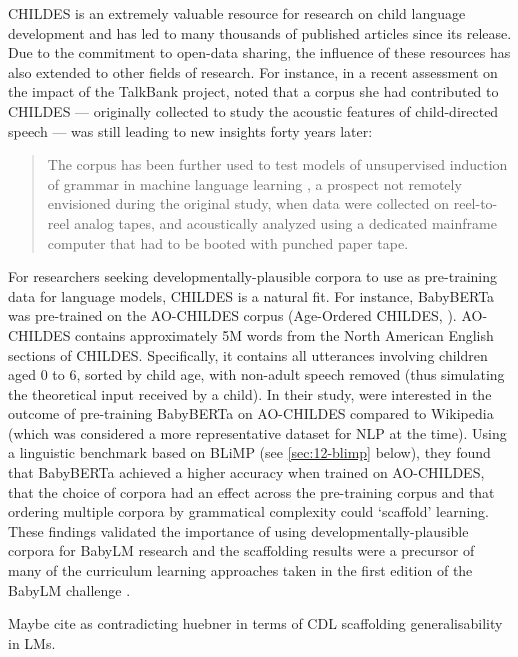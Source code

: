 CHILDES is an extremely valuable resource for research on child language development and has led to many thousands of published articles since its release. Due to the commitment to open-data sharing, the influence of these resources has also extended to other fields of research. For instance, in a recent assessment on the impact of the TalkBank project, \citet{bernstein_ratner_augmenting_2024} noted that a corpus she had contributed to CHILDES --- originally collected to study the acoustic features of child-directed speech \citep{Ratner_1984} --- was still leading to new insights forty years later:
\begin{quote}
The corpus has been further used to test models of unsupervised induction of grammar in machine language learning \citep{glushchenko_programmatic_2019}, a prospect not remotely envisioned during the original study, when data were collected on reel-to-reel analog tapes, and acoustically analyzed using a dedicated mainframe computer that had to be booted with punched paper tape.
\end{quote}

For researchers seeking developmentally-plausible corpora to use as pre-training data for language models, CHILDES is a natural fit. For instance, BabyBERTa was pre-trained on the AO-CHILDES corpus (Age-Ordered CHILDES, \citep{huebner2021using}). AO-CHILDES contains approximately 5M words from the North American English sections of CHILDES. Specifically, it contains all utterances involving children aged 0 to 6, sorted by child age, with non-adult speech removed (thus simulating the theoretical input received by a child). In their study, \citet{huebner-etal-2021-babyberta} were interested in the outcome of pre-training BabyBERTa on AO-CHILDES compared to Wikipedia (which was considered a more representative dataset for NLP at the time). Using a linguistic benchmark based on BLiMP (see \cref{sec:12-blimp} below), they found that BabyBERTa achieved a higher accuracy when trained on AO-CHILDES, that the choice of corpora had an effect across the pre-training corpus and that ordering multiple corpora by grammatical complexity could `scaffold' learning. These findings validated the importance of using developmentally-plausible corpora for BabyLM research and the scaffolding results were a precursor of many of the curriculum learning approaches taken in the first edition of the BabyLM challenge \addcites.


Maybe cite \citep{padovani2025child} as contradicting huebner in terms of CDL scaffolding generalisability in LMs.


